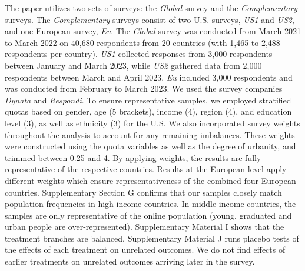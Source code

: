 \begin{small}
The paper utilizes two sets of surveys: the \textit{Global} survey and the \textit{Complementary} surveys. The \textit{Complementary} surveys consist of two U.S. surveys, \textit{US1} and \textit{US2}, and one European survey, \textit{Eu}. The \textit{Global} survey was conducted from March 2021 to March 2022 on 40,680 respondents from 20 countries (with 1,465 to 2,488 respondents per country). \textit{US1} collected responses from 3,000 respondents between January and March 2023, while \textit{US2} gathered data from 2,000 respondents between March and April 2023. \textit{Eu} included 3,000 respondents and was conducted from February to March 2023. We used the survey companies \emph{Dynata} and \emph{Respondi}. To ensure representative samples, we employed stratified quotas based on gender, age (5 brackets), income (4), region (4), and education level (3), as well as ethnicity (3) for the U.S. We also incorporated survey weights throughout the analysis to account for any remaining imbalances. These weights were constructed using the quota variables as well as the degree of urbanity, and trimmed between 0.25 and 4. By applying weights, the results are fully representative of the respective countries. Results at the European level apply different weights which ensure  representativeness of the combined four European countries. 
Supplementary Section G confirms 
that our samples closely match population frequencies in high-income countries. In middle-income countries, the samples are only representative of the online population (young, graduated and urban people are over-represented). Supplementary Material I shows that the treatment branches are balanced. Supplementary Material J runs placebo tests of the effects of each treatment on unrelated outcomes. We do not find effects of earlier treatments on unrelated outcomes arriving later in the survey. %



\end{small}
